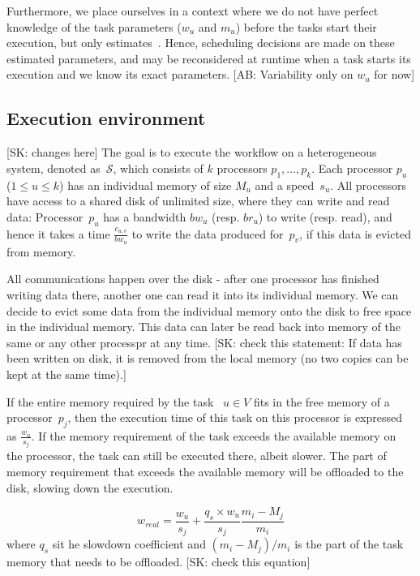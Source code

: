 \documentclass[conference]{IEEEtran}
\newcommand{\cluster}{\,\mathcal{S}}
\newcommand{\bw}{bw}
\newcommand{\br}{br}
\newcommand{\skug}[1]{{\color{blue}[SK: #1]}}
\newcommand{\hmey}[1]{{\color{red}[HM: #1]}}
\newcommand{\AB}[1]{{\color{purple}[AB: #1]}}
\begin{document}
Furthermore, we place ourselves in a context where we do not have perfect knowledge
of the task parameters ($w_u$ and $m_u$) before the tasks start their execution,
but only estimates~\cite{rahman2013,GARG2015256}.  
Hence, scheduling decisions are made on these estimated parameters, and
may be reconsidered at runtime when a task starts its execution and we know its exact parameters.
\AB{Variability only on $w_u$ for now}

    \subsection{Execution environment}
    \label{sec.mod.plat}
\skug{changes here}
The goal is to execute the workflow on a heterogeneous system, denoted as $\cluster$, which
consists of $k$ processors $p_1, \dots, p_k$.
Each processor $p_u$ ($1 \leq u \leq k$) has an individual memory of size $M_u$ and a speed~$s_u$.
All processors have access to a shared disk of unlimited size, where they can write
and read data: Processor~$p_u$ has a bandwidth $\bw_u$ (resp. $\br_u$) to write  (resp. read),
and hence it takes a time $\frac{c_{u,v}}{bw_u}$ to write the data produced for~$p_v$, 
if this data is evicted from memory. 

All communications happen over the disk - after one processor has finished writing data there, another one can read
it into its individual memory.
We can decide to evict some data from the individual memory onto the disk to free space in the individual memory.
This data can later be read back into memory of the same or any other processpr at any time.
\skug {check this statement: If data has been written on disk, it is removed from the local memory (no two copies can be kept at the same time).}

If the entire memory required by the task ~$u\in V$ fits in the free memory of a processor~$p_j$,
    then the execution time of this task on this processor is expressed as $\frac{w_u}{s_j}$.
If the memory requirement of the task exceeds the available memory on the processor, the task can still be executed there,
    albeit slower.
The part of memory requirement that exceeds the available memory will be offloaded to the disk, slowing down the execution.

    \[
        w_{real} = \frac{w_u}{s_j} +    \frac{q_s \times w_u}{s_j} \frac{m_i - M_j}{m_i}
    \]
where $q_s$ sit he slowdown coefficient and $(m_i - M_j)/m_i$ is the part of the task memory that needs to be offloaded.
    \skug{check this equation}
\end{document}
